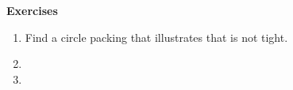 \noindent \textbf{Exercises}


\begin{enumerate}
	\item Find a circle packing that illustrates that  is not tight.
	
	\item 
	
	\item 
	
\end{enumerate}
